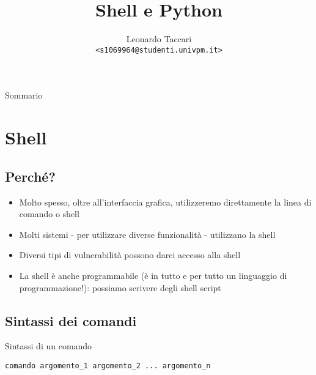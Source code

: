 \documentclass{beamer}
\title{Shell e Python}
\author[leot]{Leonardo Taccari \\ {\footnotesize \texttt{<s1069964@studenti.univpm.it>}}}
\date{}
\begin{document}
\begin{frame}
\maketitle
\end{frame}

\begin{frame}{Sommario}
\tableofcontents
\end{frame}

\section{Shell}
\begin{frame}{\insertsection}
\end{frame}

\subsection*{Perché?}
\begin{frame}{\insertsubsection}
\begin{itemize}
\item Molto spesso, oltre all'interfaccia grafica, utilizzeremo
direttamente la linea di comando o \alert{shell}
\item Molti sistemi - per utilizzare diverse funzionalità - utilizzano la shell
\item Diversi tipi di \alert{vulnerabilità} possono darci accesso alla shell
\item La \alert{shell} è anche programmabile (è in tutto e per tutto un
linguaggio di programmazione!): possiamo scrivere degli
\alert{shell script}
\end{itemize}
\end{frame}

\subsection*{Sintassi dei comandi}
\begin{frame}[fragile]{\insertsubsection}
\begin{block}{Sintassi di un comando}
\begin{verbatim}
comando argomento_1 argomento_2 ... argomento_n
\end{verbatim}
\end{block}
\end{frame}
\end{document}
